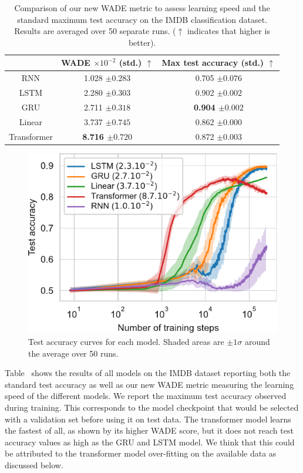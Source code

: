 \begin{table}[htbp]
  \centering
  \begin{tabular}{c|cc}
\toprule
& \bfseries WADE $\times 10^{-2}$ (std.) $\uparrow$ & \bfseries Max test accuracy (std.) $\uparrow$ \\
\midrule
    RNN & 1.028 ${\scriptstyle \pm0.283}$ & 0.705 ${\scriptstyle \pm0.076 }$ \\
LSTM & 2.280 ${\scriptstyle \pm0.303}$ & 0.902 ${\scriptstyle \pm0.002 }$ \\
GRU & 2.711 ${\scriptstyle \pm0.318}$ & \bfseries 0.904 ${\scriptstyle \pm0.002 }$ \\
Linear & 3.737 ${\scriptstyle \pm0.745}$ & 0.862 ${\scriptstyle \pm0.000 }$ \\
Transformer & \bfseries 8.716 ${\scriptstyle \pm0.720}$ & 0.872 ${\scriptstyle \pm0.003 }$ \\

    \bottomrule
  \end{tabular}
  \caption{Comparison of our new WADE metric to assess learning speed
    and the standard maximum test accuracy on the IMDB
    classification dataset. Results are averaged over 50 separate runs. ($\uparrow$
    indicates that higher is better).
    \label{tab:comp-sup-acc}}
\end{table}

\begin{figure}

  \centering
  \includegraphics[width=.6\linewidth]{figures/wade_supervised_fixed.pdf}
  \caption{Test accuracy curves for each model. Shaded areas are
    $\pm 1\sigma$ around the average over 50 runs.\label{fig:wade-sup}}%
  \end{figure}

Table~ shows the results of all models on the IMDB dataset
reporting both the standard test accuracy as well as our new WADE metric
measuring the learning speed of the different models. We report the maximum test
accuracy observed during training. This corresponds to the model checkpoint that
would be selected with a validation set before using it on test data. The
transformer model learns the fastest of all, as shown by its higher WADE score,
but it does not reach test accuracy values as high as the GRU and LSTM model. We
think that this could be attributed to the transformer model over-fitting on the
available data as discussed below.

